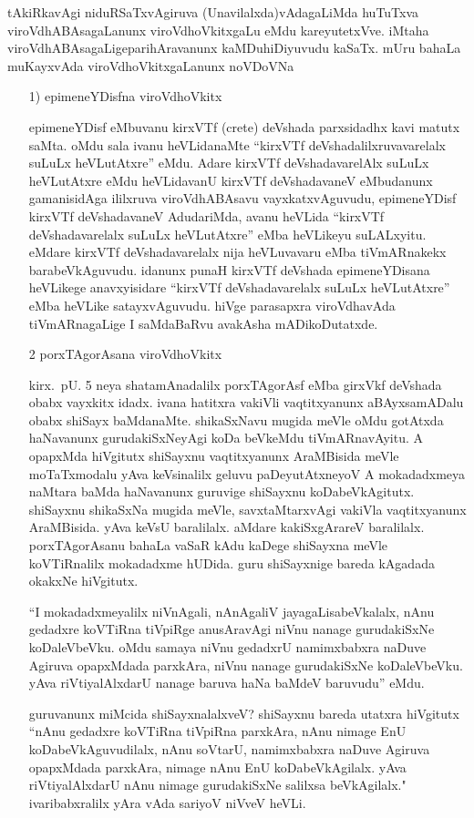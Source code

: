 tAkiRkavAgi niduRSaTxvAgiruva (Unavilalxda)vAdagaLiMda huTuTxva viroVdhA\break BAsagaLanunx viroVdhoVkitxgaLu eMdu kareyutetxVve. iMtaha viroVdhABAsagaLige\break parihAravanunx kaMDuhiDiyuvudu kaSaTx. mUru bahaLa muKayxvAda viroVdhoVkitx\-gaLanunx noVDoVNa
\begin{itemize}
\item[{\rm 1)}] epimeneYDisfna viroVdhoVkitx

epimeneYDisf eMbuvanu kirxVTf {\rm (crete)} deVshada parxsidadhx kavi matutx saMta. oMdu sala ivanu heVLidanaMte ``kirxVTf deVshadalilxruvavarelalx suLuLx heVLutAtxre'' eMdu. Adare kirxVTf deVshadavarelAlx suLuLx heVLutAtxre eMdu heVLidavanU kirxVTf deVshada\-vaneV eMbudanunx gamanisidAga ililxruva viroVdhABAsavu vayxkatx\-vAguvudu, epimeneYDisf kirxVTf deVshadavaneV AdudariMda, avanu heVLida ``kirxVTf deVshadavarelalx suLuLx heVLutAtxre'' eMba heVLikeyu suLALxyitu. eMdare kirxVTf deVshadavarelalx nija heVLuvavaru eMba tiVmARnakekx barabeVkAguvudu. idanunx punaH kirxVTf deVshada epimeneYDisana heVLikege anavxyisidare ``kirxVTf deVshadavarelalx suLuLx heVLutAtxre'' eMba heVLike satayxvAguvudu. hiVge parasapxra viroVdhavAda tiVmARnagaLige I saMdaBaRvu avakAsha mADikoDutatxde.
\item[{\rm 2}] porxTAgorAsana viroVdhoVkitx

kirx.~pU. {\rm 5} neya shatamAnadalilx porxTAgorAsf eMba girxVkf deVshada obabx vayxkitx idadx. ivana hatitxra vakiVli vaqtitxyanunx aBAyxsamADalu obabx shiSayx \-baMdanaMte. shikaSxNavu mugida meVle oMdu gotAtxda haNavanunx gurudakiSxNeyAgi koDa beVkeMdu tiVmARnavAyitu. A opapxMda hiVgitutx shiSayxnu vaqtitxyanunx AraMBisida meVle moTaTxmodalu yAva keVsinalilx geluvu paDeyutAtxneyoV A mokadadxmeya naMtara baMda haNavanunx guruvige shiSayxnu koDabeVkAgitutx. shiSayxnu shikaSxNa mugida meVle, savxtaMtarxvAgi vakiVla vaqtitxyanunx AraMBisida. yAva keVsU baralilalx. aMdare kakiSxgArareV baralilalx. porxTAgorAsanu bahaLa vaSaR kAdu kaDege shiSayxna meVle koVTiRnalilx mokadadxme hUDida. guru shiSayxnige bareda kAgadada okakxNe hiVgitutx.

``I mokadadxmeyalilx niVnAgali, nAnAgaliV jayagaLisabeVkalalx, nAnu gedadxre koVTiRna tiVpiRge anusAravAgi niVnu nanage gurudakiSxNe koDaleVbeVku. oMdu samaya niVnu gedadxrU namimxbabxra naDuve Agiruva opapxMdada parxkAra, niVnu nanage gurudakiSxNe koDaleVbeVku. yAva riVtiyalAlxdarU nanage baruva haNa baMdeV baruvudu'' eMdu.

guruvanunx miMcida shiSayxnalalxveV? shiSayxnu bareda utatxra hiVgitutx ``nAnu gedadxre koVTiRna tiVpiRna parxkAra, nAnu nimage EnU koDabeVkAguvudilalx, nAnu soVtarU, namimxbabxra naDuve Agiruva opapxMdada parxkAra, nimage nAnu EnU koDabeVkAgilalx. yAva riVtiyalAlxdarU nAnu nimage gurudakiSxNe salilxsa beVkAgilalx." ivaribabxralilx yAra vAda sariyoV niVveV heVLi.


\end{itemize}
